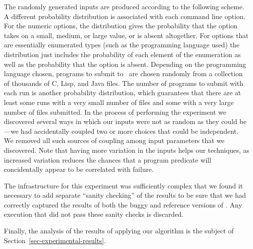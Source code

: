 The randomly generated inputs are produced according to the following
scheme.  A different probability distribution is associated with each
command line option.  For the numeric options, the distribution gives
the probability that the option takes on a small, medium, or large
value, or is absent altogether.  For options that are essentially
enumerated types (such as the programming language used) the
distribution just includes the probability of each element of the
enumeration as well as the probability that the option is absent.
Depending on the programming language chosen, programs to submit to
\moss\ are chosen randomly from a collection of thousands of C, Lisp,
and Java files.  The number of programs to submit with each run is
another probability distribution, which guarantees that there are at
least some runs with a very small number of files and some with a very
large number of files submitted.  In the process of performing the
experiment we discovered several ways in which our inputs were not as
random as they could be---we had accidentally coupled two or more
choices that could be independent.  We removed all such sources of
coupling among input parameters that we discovered.  Note that having
more variation in the inputs helps our techniques, as
increased variation reduces the chances that a program predicate will
concidentally appear to be correlated with failure.

The infrastructure for this experiment was sufficiently complex
that we found it necessary to add separate ``sanity checking'' of the results
to be sure that we had correctly captured the results of both the buggy and
reference versions of \moss.  Any execution that did not pass these sanity
checks is discarded.  

Finally, the analysis of the results of applying our algorithm is the subject of Section~\ref{sec-experimental-results}.










 


